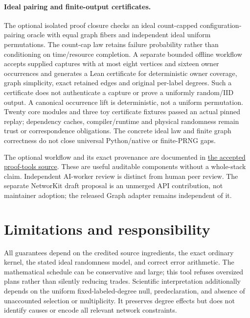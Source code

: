 \documentclass[11pt]{article}
\begin{document}
\paragraph{Ideal pairing and finite-output certificates.} The optional isolated proof closure checks an ideal count-capped configuration-pairing oracle with equal graph fibers and independent ideal uniform permutations. The count-cap law retains failure probability rather than conditioning on time/resource completion. A separate bounded offline workflow accepts supplied captures with at most eight vertices and sixteen owner occurrences and generates a Lean certificate for deterministic owner coverage, graph simplicity, exact retained edges and original per-label degrees. Such a certificate does not authenticate a capture or prove a uniformly random/IID output. A canonical occurrence lift is deterministic, not a uniform permutation. Twenty core modules and three toy certificate fixtures passed an actual pinned replay; dependency caches, compiler/runtime and physical randomness remain trust or correspondence obligations. The concrete ideal law and finite graph correctness do not close universal Python/native or finite-PRNG gaps.

The optional workflow and its exact provenance are documented in \href{https://github.com/DaniilKi/curveball-error-budget/tree/622534c2759e6889828fa4597667518906ff8753/proof-tools/configuration-pairing}{the accepted proof-tools source}. These are useful auditable components without a whole-stack claim. Independent AI-worker review is distinct from human peer review. The separate NetworKit draft proposal is an unmerged API contribution, not maintainer adoption; the released Graph adapter remains independent of it.

\section{Limitations and responsibility}
All guarantees depend on the credited source ingredients, the exact ordinary kernel, the stated ideal randomness model, and correct error arithmetic. The mathematical schedule can be conservative and large; this tool refuses oversized plans rather than silently reducing trades. Scientific interpretation additionally depends on the uniform fixed-labeled-degree null, predeclaration, and absence of unaccounted selection or multiplicity. It preserves degree effects but does not identify causes or encode all relevant network constraints.
\end{document}
